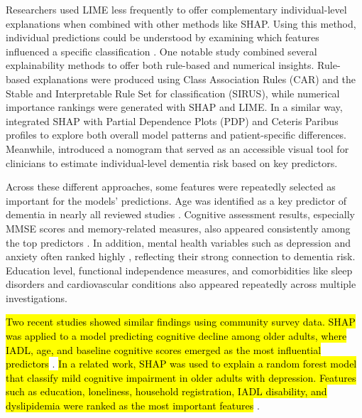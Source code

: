 Researchers used LIME less frequently to offer complementary individual-level explanations when combined with other methods like SHAP. Using this method, individual predictions could be understood by examining which features influenced a specific classification \cite{abbas2024Explainable, Mahamud2025Enhancing, Vyas2022Identifying}. One notable study \cite{abbas2024Explainable} combined several explainability methods to offer both rule-based and numerical insights. Rule-based explanations were produced using Class Association Rules (\acrshort{CAR}) and the Stable and Interpretable Rule Set for classification (SIRUS), while numerical importance rankings were generated with SHAP and LIME. In a similar way,  integrated SHAP with Partial Dependence Plots (\acrshort{PDP}) and Ceteris Paribus profiles to explore both overall model patterns and patient-specific differences. Meanwhile,  introduced a nomogram that served as an accessible visual tool for clinicians to estimate individual-level dementia risk based on key predictors.

Across these different approaches, some features were repeatedly selected as important for the models' predictions. Age was identified as a key predictor of dementia in nearly all reviewed studies \cite{Akter2025Using, Basta2023Personalized, Danso2021Developing, Georgiev2024Predicting, Li2023Early, Twait2023Dementia}. Cognitive assessment results, especially MMSE scores and memory-related measures, also appeared consistently among the top predictors \cite{abbas2024Explainable, Basta2023Personalized, Hossain2025Optimizing, Ren2023Improving, Twait2023Dementia, Vyas2022Identifying}. In addition, mental health variables such as depression and anxiety often ranked highly \cite{Akter2025Using, Li2023Early, Li2023Machine, Sharma2024Leveraging}, reflecting their strong connection to dementia risk. Education level, functional independence measures, and comorbidities like sleep disorders and cardiovascular conditions also appeared repeatedly across multiple investigations.

\hl{Two recent studies showed similar findings using community survey data. SHAP was applied to a model predicting cognitive decline among older adults, where IADL, age, and baseline cognitive scores emerged as the most influential predictors} \cite{Ren2025Using}. \hl{In a related work, SHAP was used to explain a random forest model that classify mild cognitive impairment in older adults with depression. Features such as education, loneliness, household registration, IADL disability, and dyslipidemia were ranked as the most important features} \cite{Yao2025Machine}.


